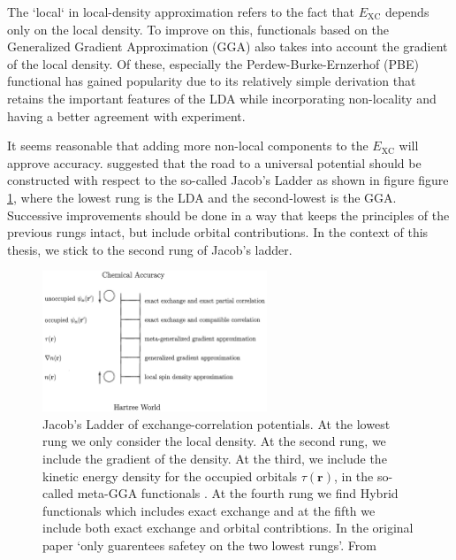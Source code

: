 The `local` in local-density approximation refers to the fact that $E_\text{XC}$ depends only on the local density. To improve on this, functionals based on the Generalized Gradient Approximation (GGA) also takes into account the gradient of the local density. Of these, especially the Perdew-Burke-Ernzerhof (PBE) functional has gained popularity due to its relatively simple derivation that retains the important features of the LDA while incorporating non-locality and having a better agreement with experiment.

It seems reasonable that adding more non-local components to the $E_\text{XC}$ will approve accuracy. \citeauthor{Perdew2001} suggested that the road to a universal potential should be constructed with respect to the so-called Jacob's Ladder \cite{Perdew2001} as shown in figure figure \ref{fig:jacobs_ladder}, where the lowest rung is the LDA and the second-lowest is the GGA. Successive improvements should be done in a way that keeps the principles of the previous rungs intact, but include orbital contributions. In the context of this thesis, we stick to the second rung of Jacob's ladder.

\begin{figure}
	\centering
	\includegraphics[width=0.6\textwidth]{fig/method/dft/jacobs_ladder.png}
	\caption{Jacob's Ladder of exchange-correlation potentials. At the lowest rung we only consider the local density. At the second rung, we include the gradient of the density. At the third, we include the kinetic energy density for the occupied orbitals $\tau (\bm{r})$, in the so-called meta-GGA functionals \cite{Tao2003}. At the fourth rung we find  Hybrid functionals which includes exact exchange and at the fifth we include both exact exchange and orbital contribtions. In the original paper \cite{Perdew2001} `only guarentees safetey on the two lowest rungs'. From \cite{Perdew2001}}
	\label{fig:jacobs_ladder}
\end{figure}

